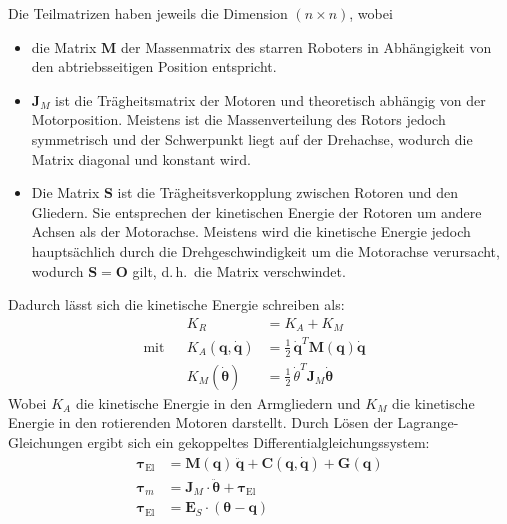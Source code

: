 \documentclass[a4paper, 11pt, accentcolor = tud3b]{tudreport}
\newcommand{\mat}[1]{\boldsymbol{#1}}
\renewcommand{\vec}[1]{\boldsymbol{\mathbf{#1}}}
\renewcommand{\dh}{d.\,h.~}
\begin{document}
					Die Teilmatrizen haben jeweils die Dimension \( (n \times n) \), wobei
					\begin{itemize}
						\item die Matrix \( \mat{M} \) der Massenmatrix des starren Roboters in Abhängigkeit von den abtriebsseitigen Position entspricht.
						\item \( \mat{J}_M \) ist die Trägheitsmatrix der Motoren und theoretisch abhängig von der Motorposition. Meistens ist die Massenverteilung des Rotors jedoch symmetrisch und der Schwerpunkt liegt auf der Drehachse, wodurch die Matrix diagonal und konstant wird.
						\item Die Matrix \( \mat{S} \) ist die Trägheitsverkopplung zwischen Rotoren und den Gliedern. Sie entsprechen der kinetischen Energie der Rotoren um andere Achsen als der Motorachse. Meistens wird die kinetische Energie jedoch hauptsächlich durch die Drehgeschwindigkeit um die Motorachse verursacht, wodurch \( \mat{S} = \mat{O} \) gilt, \dh die Matrix verschwindet.
					\end{itemize}
					Dadurch lässt sich die kinetische Energie schreiben als:
					\begin{align*}
						           &  & K_R                           & = K_A + K_M                                                       &  \\
						\text{mit} &  & K_A(\vec{q}, \dot{\vec{q}}\!) & = \frac{1}{2} \, \dot{\vec{q}}^T \mat{M}(\vec{q}\!) \dot{\vec{q}} &  \\
						           &  & K_M(\dot{\vec{\theta}}\!)     & = \frac{1}{2} \, \dot{\theta}^T \mat{J}_M \dot{\vec{\theta}}      &
					\end{align*}
					Wobei \( K_A \) die kinetische Energie in den Armgliedern und \( K_M \) die kinetische Energie in den rotierenden Motoren darstellt. Durch Lösen der Lagrange-Gleichungen ergibt sich ein gekoppeltes Differentialgleichungssystem:
					\begin{align*}
						\vec{\tau}_\text{El} & = \mat{M}(\vec{q}\!) \, \ddot{\vec{q}} + \vec{C}(\vec{q}, \dot{\vec{q}}\!) + \vec{G}(\vec{q}\!) \\
						\vec{\tau}_m         & = \mat{J}_M \cdot \ddot{\vec{\theta}} + \vec{\tau}_\text{El}                                 \\
						\vec{\tau}_\text{El} & = \mat{E}_S \cdot (\vec{\theta} - \vec{q}\!)  \label{eqn:elastic_tau}
					\end{align*}
\end{document}
